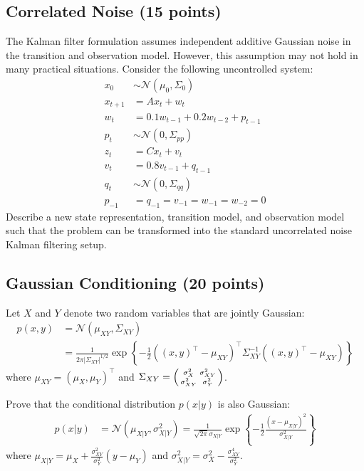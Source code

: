 \documentclass{article}
\newcommand{\?}{\stackrel{?}{=}}
\begin{document}
\clearpage

\subsection{Correlated Noise (15 points)}
The Kalman filter formulation assumes independent additive Gaussian noise in the transition and observation model.
However, this assumption may not hold in many practical situations.
Consider the following uncontrolled system:
\begin{align*}
  x_0 &\sim \mathcal{N}(\mu_0, \Sigma_0) \\
  x_{t+1} &= A x_t + w_t \\
  w_{t} &= 0.1 w_{t-1} + 0.2 w_{t-2} + p_{t-1} \\
  p_t &\sim \mathcal{N}(0, \Sigma_{pp}) \\
  z_t &= Cx_t + v_t \\
  v_t &= 0.8 v_{t-1} + q_{t-1} \\
  q_t &\sim \mathcal{N}(0, \Sigma_{qq}) \\
  p_{-1} &= q_{-1} = v_{-1} = w_{-1} = w_{-2} = 0
\end{align*}
Describe a new state representation, transition model, and observation model such that the problem can be transformed into the standard uncorrelated noise Kalman filtering setup.


\subsection{Gaussian Conditioning (20 points)}

Let $X$ and $Y$ denote two random variables that are jointly Gaussian:
\begin{align*}
  p(x, y)
  &= \mathcal{N}(\mu_{XY}, \Sigma_{XY}) \\
  &= \frac{1}{2 \pi |\Sigma_{XY}|^{1/2}}
    \exp \left\{ -\frac{1}{2} ((x, y)^\top - \mu_{XY})^\top \Sigma_{XY}^{-1} ((x, y)^\top - \mu_{XY}) \right\}
\end{align*}
where $\mu_{XY} = (\mu_{X}, \mu_{Y})^\top$ and
$\Sigma_{XY} = \begin{psmallmatrix} \sigma_X^2 & \sigma_{XY}^2 \\ \sigma_{XY}^2 & \sigma_Y^2 \end{psmallmatrix}$.

\bigskip
Prove that the conditional distribution $p(x|y)$ is also Gaussian:
\begin{align*}
  p(x|y)
  &= \mathcal{N}(\mu_{X|Y}, \sigma_{X|Y}^2)
    = \frac{1}{\sqrt{2\pi}\sigma_{X|Y}} \exp \left\{ -\frac{1}{2} \frac{(x - \mu_{X|Y})^2}{\sigma_{X|Y}^2} \right\}
\end{align*}
where $\mu_{X|Y} = \mu_{X} + \frac{\sigma_{XY}^2}{\sigma_{Y}^2} (y - \mu_{Y})$ and
$\sigma_{X|Y}^2 = \sigma_X^2 - \frac{\sigma_{XY}^4}{\sigma_Y^2}$.
\end{document}
